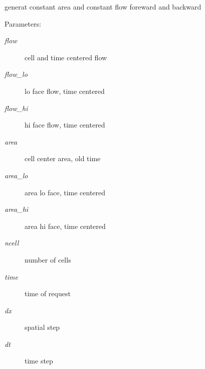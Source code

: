 generat constant area and constant flow foreward and backward 

\begin{Desc}
\item[Parameters:]
\begin{description}
\item[{\em flow}]cell and time centered flow\item[{\em flow\_\-lo}]lo face flow, time centered\item[{\em flow\_\-hi}]hi face flow, time centered\item[{\em area}]cell center area, old time\item[{\em area\_\-lo}]area lo face, time centered\item[{\em area\_\-hi}]area hi face, time centered\item[{\em ncell}]number of cells\item[{\em time}]time of request\item[{\em dx}]spatial step\item[{\em dt}]time step \end{description}
\end{Desc}
